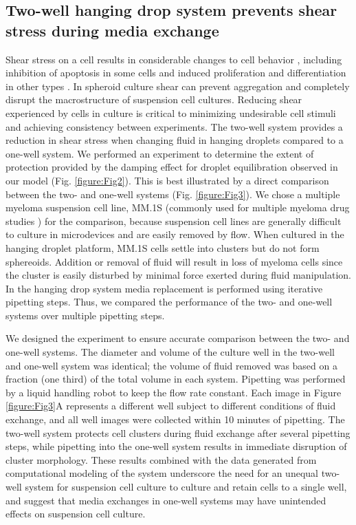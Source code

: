 \subsection{Two-well hanging drop system prevents shear stress during media exchange}
Shear stress on a cell results in considerable changes to cell behavior \cite{White2007}, including inhibition of apoptosis in some cells \cite{Dimmeler1996} and induced proliferation and differentiation in other types \cite{Yamamoto2003}. In spheroid culture shear can prevent aggregation and completely disrupt the macrostructure of suspension cell cultures. Reducing shear experienced by cells in culture is critical to minimizing undesirable cell stimuli and achieving consistency between experiments. The two-well system provides a reduction in shear stress when changing fluid in hanging droplets compared to a one-well system. We performed an experiment to determine the extent of protection provided by the damping effect for droplet equilibration observed in our model (Fig. \ref{figure:Fig2}). This is best illustrated by a direct comparison between the two- and one-well systems (Fig. \ref{figure:Fig3}). We chose a multiple myeloma suspension cell line, MM.1S (commonly used for multiple myeloma drug studies \cite{Greenstein2003, Tai2006, Azab2009}) for the comparison, because suspension cell lines are generally difficult to culture in microdevices and are easily removed by flow. When cultured in the hanging droplet platform, MM.1S cells settle into clusters but do not form sphereoids. Addition or removal of fluid will result in loss of myeloma cells since the cluster is easily disturbed by minimal force exerted during fluid manipulation. In the hanging drop system media replacement is performed using iterative pipetting steps. Thus, we compared the performance of the two- and one-well systems over multiple pipetting steps.

We designed the experiment to ensure accurate comparison between the two- and one-well systems. The diameter and volume of the culture well in the two-well and one-well system was identical; the volume of fluid removed was based on a fraction (one third) of the total volume in each system. Pipetting was performed by a liquid handling robot to keep the flow rate constant. Each image in Figure \ref{figure:Fig3}A represents a different well subject to different conditions of fluid exchange, and all well images were collected within 10 minutes of pipetting. The two-well system protects cell clusters during fluid exchange after several pipetting steps, while pipetting into the one-well system results in immediate disruption of cluster morphology. These results combined with the data generated from computational modeling of the system underscore the need for an unequal two-well system for suspension cell culture to culture and retain cells to a single well, and suggest that media exchanges in one-well systems may have unintended effects on suspension cell culture.

